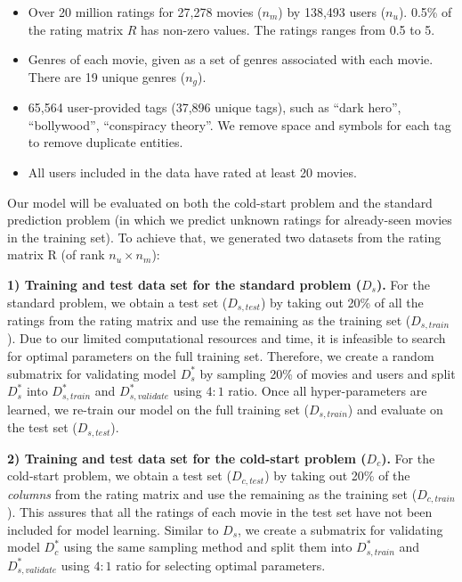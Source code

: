 \documentclass{article} %
\begin{document}
\begin{itemize}[leftmargin=15pt]
	\item Over 20 million ratings for 27,278 movies ($n_m$) by 138,493 users ($n_u$).
	0.5\% of the rating matrix $R$ has non-zero values.  The ratings ranges from 0.5 to 5.

	\item Genres of each movie, given as a set of genres associated with each
movie. There are 19 unique genres ($n_g$).

	\item 65,564 user-provided tags (37,896 unique tags), such as ``dark hero'', ``bollywood'',
	``conspiracy theory''.  We remove space and symbols for each tag to remove duplicate entities.

	\item All users included in the data have rated at least 20 movies.
\end{itemize}

Our model will be evaluated on both the cold-start problem and the standard
prediction problem (in which we predict unknown ratings for already-seen
movies in the training set). To achieve that, we generated two datasets from the
rating matrix R (of rank $n_u \times n_m$):

\textbf{1) Training and test data set for the standard problem ($D_s$).} For
the standard problem, we obtain a test set ($D_{s,test}$) by taking out 20\%
of all the ratings from the rating matrix and use the remaining as the
training set ($D_{s,train}$). Due to our limited computational resources and
time, it is infeasible to search for optimal parameters on the full training
set. Therefore, we create a random submatrix for validating model $D^*_{s}$ by
sampling 20\% of movies and users and split $D^*_{s}$ into $D^*_{s,train}$ and
$D^*_{s,validate}$ using $4:1$ ratio. Once all hyper-parameters are learned,
we re-train our model on the full training set ($D_{s,train}$) and evaluate on
the test set ($D_{s,test}$).

\textbf{2) Training and test data set for the cold-start problem ($D_c$).} For
the cold-start problem, we obtain a test set ($D_{c,test}$) by taking out 20\%
of   the {\em columns} from the rating matrix and use the remaining as the
training set ($D_{c,train}$). This assures that all the ratings of each movie
in the test set have not been included for model learning.   Similar to $D_s$, we create a submatrix for validating model $D^*_{c}$ using the same sampling method and split them into $D^*_{s,train}$ and $D^*_{s,validate}$ using $4:1$ ratio for
selecting optimal parameters.
\end{document}
